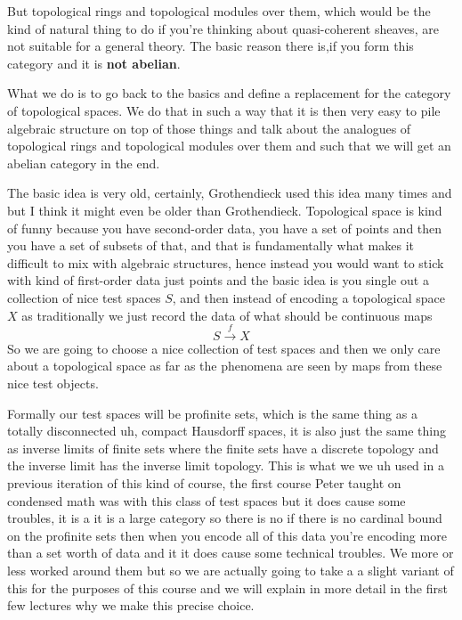 But topological rings and topological modules over them, which would be the kind of natural thing to do if you're thinking about quasi-coherent sheaves, are not suitable for a general theory. The basic reason there is,if you form this category and it is \textbf{not abelian}.


What we do is to go back to the basics and define a replacement for the category of topological spaces. We do that in such a way that it is then very easy to pile algebraic structure on top of those things and talk about the analogues of topological rings and topological modules over them and such that we will get an abelian category in the end.


The basic idea is very old, certainly, Grothendieck used this idea many times and but I think it might even be older than Grothendieck. Topological space is kind of funny because you have second-order data, you have a set of points and then you have a set of subsets of that, and that is fundamentally what makes it difficult to mix with algebraic structures, hence instead you would want to stick with kind of first-order data just points and the basic idea is you single out a collection of nice test spaces $S$, and then instead of encoding a topological space $X$ as traditionally we just record the data of what should be continuous maps 
  $$ S \xrightarrow{f} X$$
So we are going to choose a nice collection of test spaces and then we only care about a topological space as far as the phenomena are seen by maps from these nice test objects.  


Formally our test spaces will be profinite sets, which is the same thing as a totally disconnected uh, compact Hausdorff spaces, it is also just the same thing as inverse limits of finite sets where the finite sets have a discrete topology and the inverse limit has the inverse limit topology. This is what we we uh used in a previous iteration of this kind of course, the first course Peter taught on condensed math was with this class of test spaces but it does cause some troubles, it is a it is a large category so there is no if there is no cardinal bound on the profinite sets then when you encode all of this data you're encoding more than a set worth of data and it it does cause some technical troubles. We more or less worked around them but so we are actually going to take a a slight variant of this for the purposes of this course and we will explain in more detail in the first few lectures why we make this precise choice.

